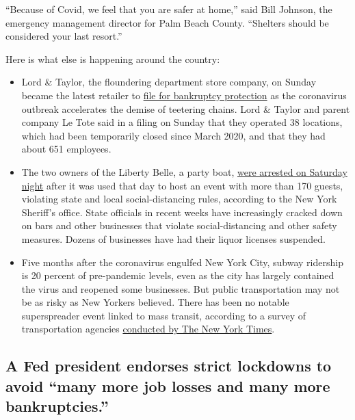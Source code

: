 ``Because of Covid, we feel that you are safer at home,'' said Bill
Johnson, the emergency management director for Palm Beach County.
``Shelters should be considered your last resort.''

Here is what else is happening around the country:

\begin{itemize}
\item
  Lord \& Taylor, the floundering department store company, on Sunday
  became the latest retailer to
  \href{https://www.nytimes.com/2020/08/02/business/Lord-and-Taylor-Bankruptcy.html}{file
  for bankruptcy protection} as the coronavirus outbreak accelerates the
  demise of teetering chains. Lord \& Taylor and parent company Le Tote
  said in a filing on Sunday that they operated 38 locations, which had
  been temporarily closed since March 2020, and that they had about 651
  employees.
\item
  The two owners of the Liberty Belle, a party boat,
  \href{https://www.nytimes.com/2020/08/02/nyregion/liberty-belle-illegal-party.html}{were
  arrested on Saturday night} after it was used that day to host an
  event with more than 170 guests, violating state and local
  social-distancing rules, according to the New York Sheriff's office.
  State officials in recent weeks have increasingly cracked down on bars
  and other businesses that violate social-distancing and other safety
  measures. Dozens of businesses have had their liquor licenses
  suspended.
\item
  Five months after the coronavirus engulfed New York City, subway
  ridership is 20 percent of pre-pandemic levels, even as the city has
  largely contained the virus and reopened some businesses. But public
  transportation may not be as risky as New Yorkers believed. There has
  been no notable superspreader event linked to mass transit, according
  to a survey of transportation agencies
  \href{https://www.nytimes.com/2020/08/02/nyregion/nyc-subway-coronavirus-safety.html}{conducted
  by The New York Times}.
\end{itemize}

\hypertarget{a-fed-president-endorses-strict-lockdowns-to-avoid-many-more-job-losses-and-many-more-bankruptcies}{%
\subsection{A Fed president endorses strict lockdowns to avoid ``many
more job losses and many more
bankruptcies.''}\label{a-fed-president-endorses-strict-lockdowns-to-avoid-many-more-job-losses-and-many-more-bankruptcies}}

